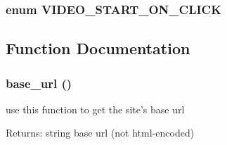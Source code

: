 \hypertarget{config_8inc_8php_e1e42e1baa41f003453356a3747f9fee}{
\subsubsection[{VIDEO\_\-START\_\-ON\_\-CLICK}]{\setlength{\rightskip}{0pt plus 5cm}enum {\bf VIDEO\_\-START\_\-ON\_\-CLICK}}}
\label{config_8inc_8php_e1e42e1baa41f003453356a3747f9fee}




\subsection{Function Documentation}
\hypertarget{config_8inc_8php_8fdfb46e432b25bbdad23971a23a26b5}{
\subsubsection[{base\_\-url}]{\setlength{\rightskip}{0pt plus 5cm}base\_\-url ()}}
\label{config_8inc_8php_8fdfb46e432b25bbdad23971a23a26b5}


use this function to get the site's base url

\begin{Desc}
\item[Returns:]string base url (not html-encoded) \end{Desc}
